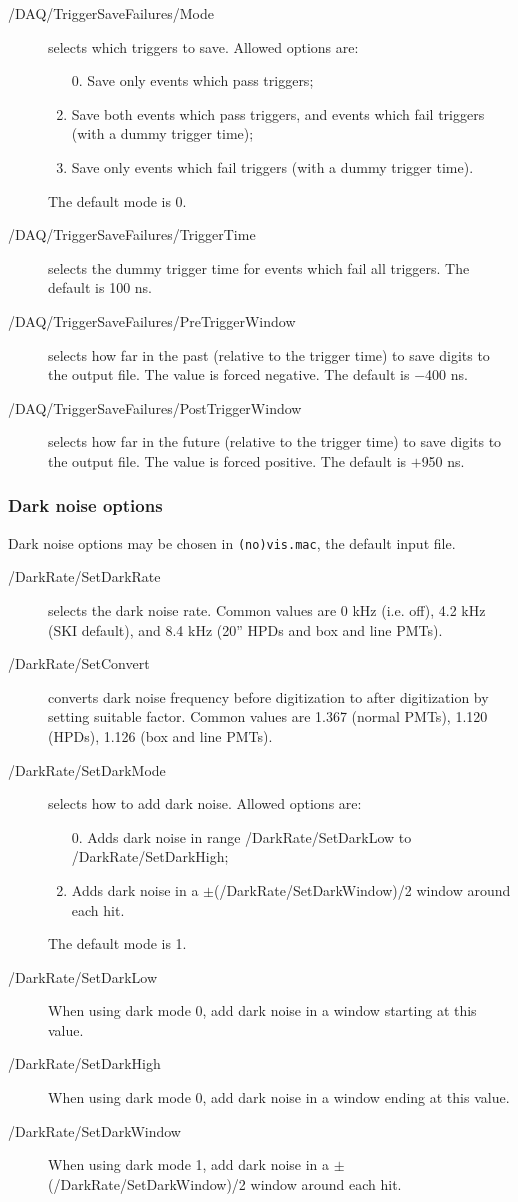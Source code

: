 \begin{description}
\item[/DAQ/TriggerSaveFailures/Mode] selects which triggers to save. Allowed options are:
  \begin{enumerate}
  \item [0.]\setcounter{enumi}{0} Save only events which pass triggers;
  \item Save both events which pass triggers, and events which fail triggers (with a dummy trigger time);
  \item Save only events which fail triggers (with a dummy trigger time).
  \end{enumerate}
The default mode is 0.
\item[/DAQ/TriggerSaveFailures/TriggerTime] selects the dummy trigger time for events which fail all triggers. The default is 100 ns.
\item[/DAQ/TriggerSaveFailures/PreTriggerWindow] selects how far in the past (relative to the trigger time) to save digits to the output file. The value is forced negative. The default is $-$400 ns. 
\item[/DAQ/TriggerSaveFailures/PostTriggerWindow] selects how far in the future (relative to the trigger time) to save digits to the output file. The value is forced positive. The default is $+$950 ns. 
\end{description}

\subsubsection{Dark noise options}
Dark noise options may be chosen in \texttt{(no)vis.mac}, the default input file.
\begin{description}
\item[/DarkRate/SetDarkRate] selects the dark noise rate. Common values are 0 kHz (i.e. off), 4.2 kHz (SKI default), and 8.4 kHz (20'' HPDs and box and line PMTs).
\item[/DarkRate/SetConvert] converts dark noise frequency before digitization to after digitization by setting suitable factor. Common values are 1.367 (normal PMTs), 1.120 (HPDs), 1.126 (box and line PMTs).
\item[/DarkRate/SetDarkMode] selects how to add dark noise. Allowed options are:
  \begin{enumerate}
  \item [0.]\setcounter{enumi}{0} Adds dark noise in range /DarkRate/SetDarkLow to /DarkRate/SetDarkHigh;
  \item Adds dark noise in a $\pm$(/DarkRate/SetDarkWindow)/2 window around each hit.
  \end{enumerate}
The default mode is 1.
\item[/DarkRate/SetDarkLow] When using dark mode 0, add dark noise in a window starting at this value.
\item[/DarkRate/SetDarkHigh] When using dark mode 0, add dark noise in a window ending at this value.
\item[/DarkRate/SetDarkWindow] When using dark mode 1, add dark noise in a $\pm$(/DarkRate/SetDarkWindow)/2 window around each hit.
\end{description}


